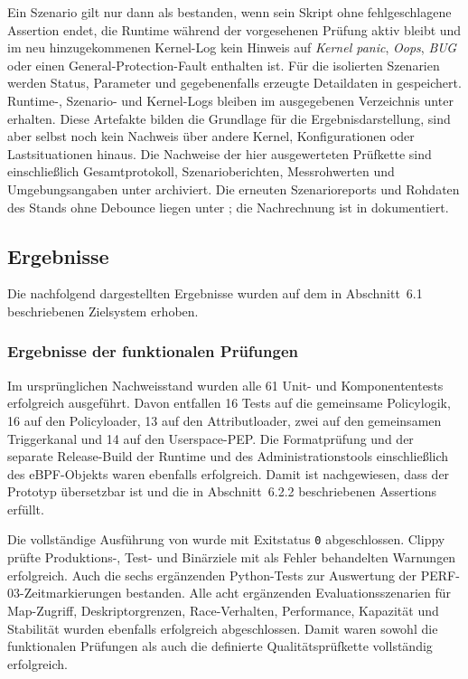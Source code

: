 Ein Szenario gilt nur dann als bestanden, wenn sein Skript ohne fehlgeschlagene Assertion endet,
die Runtime während der vorgesehenen Prüfung aktiv bleibt und im neu hinzugekommenen Kernel-Log
kein Hinweis auf \emph{Kernel panic}, \emph{Oops}, \emph{BUG} oder einen General-Protection-Fault
enthalten ist. Für die isolierten Szenarien werden Status, Parameter und gegebenenfalls erzeugte
Detaildaten in  gespeichert. Runtime-, Szenario- und Kernel-Logs bleiben im
ausgegebenen Verzeichnis unter  erhalten. Diese Artefakte bilden die
Grundlage für die Ergebnisdarstellung, sind aber selbst noch kein Nachweis über andere Kernel,
Konfigurationen oder Lastsituationen hinaus.
Die Nachweise der hier ausgewerteten Prüfkette sind einschließlich Gesamtprotokoll,
Szenarioberichten, Messrohwerten und Umgebungsangaben unter
 archiviert. Die erneuten Szenarioreports und
Rohdaten des Stands ohne Debounce liegen unter ;
die Nachrechnung ist in  dokumentiert.

\clearpage
\subsection{Ergebnisse}

Die nachfolgend dargestellten Ergebnisse wurden auf dem in Abschnitt~6.1 beschriebenen
Zielsystem erhoben.

\subsubsection{Ergebnisse der funktionalen Prüfungen}

Im ursprünglichen Nachweisstand wurden alle 61 Unit- und Komponententests erfolgreich ausgeführt. Davon entfallen 16 Tests auf
die gemeinsame Policylogik, 16 auf den Policyloader, 13 auf den Attributloader, zwei auf den
gemeinsamen Triggerkanal und 14 auf den Userspace-PEP. Die Formatprüfung und der separate
Release-Build der Runtime und des Administrationstools einschließlich des eBPF-Objekts waren
ebenfalls erfolgreich. Damit ist nachgewiesen, dass der Prototyp übersetzbar ist
und die in Abschnitt~6.2.2 beschriebenen Assertions erfüllt.

Die vollständige Ausführung von  wurde mit Exitstatus \texttt{0} abgeschlossen.
Clippy prüfte Produktions-, Test- und Binärziele mit als Fehler behandelten Warnungen erfolgreich.
Auch die sechs ergänzenden Python-Tests zur Auswertung der PERF-03-Zeitmarkierungen bestanden.
Alle acht ergänzenden Evaluationsszenarien für Map-Zugriff, Deskriptorgrenzen, Race-Verhalten,
Performance, Kapazität und Stabilität wurden ebenfalls erfolgreich abgeschlossen.
Damit waren sowohl die funktionalen Prüfungen als auch die definierte Qualitätsprüfkette
vollständig erfolgreich.

